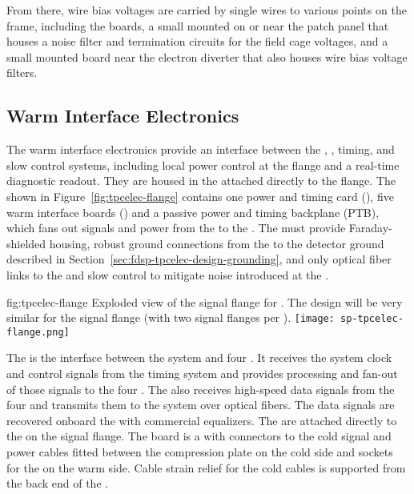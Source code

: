 From there, wire bias voltages are carried by single wires to 
various points on the  frame, including the  boards, a small  mounted on or near 
the patch panel that houses a noise filter and termination circuits for the field cage voltages, and 
a small mounted board near the electron diverter that also houses wire bias voltage filters.

\subsection{Warm Interface Electronics}
\label{sec:fdsp-tpcelec-design-warm}

The warm interface electronics provide an interface between the , , timing, and slow control systems, including local power control at the flange and a real-time diagnostic readout. They are housed in the  attached directly to the  flange.  The  shown in Figure~\ref{fig:tpcelec-flange} contains one power and timing card (), five warm interface boards () and a passive power and timing backplane (PTB), which fans out signals and  power from the  to the . The  must provide Faraday-shielded housing, robust ground connections from the  to the detector ground described in Section~\ref{sec:fdsp-tpcelec-design-grounding}, and only optical fiber links to the  and slow control to mitigate noise introduced at the  \fdth.

\begin{dunefigure}
{fig:tpcelec-flange}
{Exploded view of the  signal flange for .  The design will be very similar for the   signal flange (with two  signal flanges per \fdth).}
\texttt{[image: sp-tpcelec-flange.png]}
\end{dunefigure}

The  is the interface between the  system and four
. It receives the system clock and control signals from the
timing system and provides processing and fan-out of those signals to the four
. The  also receives high-speed data signals from the four 
 and transmits them to the  system over optical
fibers. The data signals are recovered onboard the  with commercial equalizers.
The  are attached directly to the 
 \fdth on the signal flange. The \fdth
board is a  with connectors to the cold signal and  power cables fitted
between the compression plate on the cold side and sockets for
the  on the warm side. Cable strain relief for the cold cables is 
supported from the back end of the \fdth.


